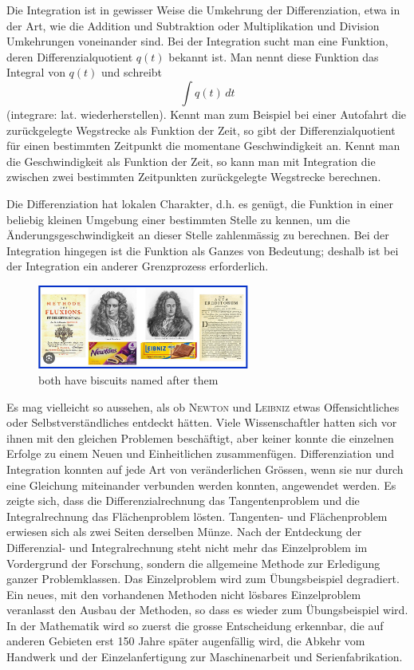 \documentclass[%
11pt,%
twoside,%
titlepage,%
german,%
headsepline%
]{scrartcl}
\begin{document}
Die Integration ist in gewisser Weise die Umkehrung der Differenziation, etwa in der Art, wie die Addition und Subtraktion oder Multiplikation und Division Umkehrungen voneinander sind. Bei der Integration sucht man eine Funktion, deren Differenzialquotient $q(t)$ bekannt ist. Man nennt diese Funktion das Integral von $q(t)$ und
schreibt
$$\int q(t)\,dt$$
(integrare: lat. wiederherstellen).
Kennt man zum Beispiel bei einer Autofahrt die zur\"uckgelegte Wegstrecke als Funktion der Zeit, so gibt der Differenzialquotient f\"ur einen bestimmten Zeitpunkt die momentane Geschwindigkeit an. Kennt man die Geschwindigkeit als Funktion der Zeit, so kann man mit Integration die zwischen zwei bestimmten Zeitpunkten zur\"uckgelegte Wegstrecke berechnen.

Die Differenziation hat lokalen Charakter, d.h. es gen\"ugt, die Funktion in einer beliebig kleinen Umgebung einer bestimmten Stelle zu kennen, um die \"Anderungsgeschwindigkeit an dieser Stelle zahlenm\"assig zu berechnen. Bei der Integration hingegen ist die Funktion als Ganzes von Bedeutung; deshalb ist bei der Integration ein anderer Grenzprozess erforderlich.

\begin{figure}
    \centering
    \includegraphics[width=0.62\textwidth]{pictures/newton_and_leibiz.jpeg}
    \caption{both have biscuits named after them}
    \label{fig:leibnizandnewton}
\end{figure}

Es mag vielleicht so aussehen, als ob \textsc{Newton} und \textsc{Leibniz} etwas Offensichtliches oder Selbstverst\"andliches entdeckt h\"atten. Viele Wissenschaftler hatten sich vor ihnen mit den gleichen Problemen besch\"aftigt, aber keiner konnte die einzelnen Erfolge zu einem Neuen und Einheitlichen zusammenf\"ugen. Differenziation und Integration konnten auf jede Art von ver\"anderlichen Gr\"ossen, wenn sie nur durch eine Gleichung miteinander verbunden werden konnten, angewendet werden. Es zeigte sich, dass die Differenzialrechnung das Tangentenproblem und die Integralrechnung das Fl\"achenproblem l\"osten. Tangenten- und Fl\"achenproblem erwiesen sich als zwei Seiten derselben M\"unze.
Nach der Entdeckung der Differenzial- und Integralrechnung steht nicht mehr das Einzelproblem im Vordergrund der Forschung, sondern die allgemeine Methode zur Erledigung ganzer Problemklassen. Das Einzelproblem wird zum \"Ubungsbeispiel degradiert. Ein neues, mit den vorhandenen Methoden nicht l\"osbares Einzelproblem veranlasst den Ausbau der Methoden, so dass es wieder zum \"Ubungsbeispiel wird. In der Mathematik wird so zuerst die grosse Entscheidung erkennbar, die auf anderen Gebieten erst 150 Jahre sp\"ater augenf\"allig wird, die Abkehr vom Handwerk und der Einzelanfertigung zur Maschinenarbeit und Serienfabrikation.
\end{document}
